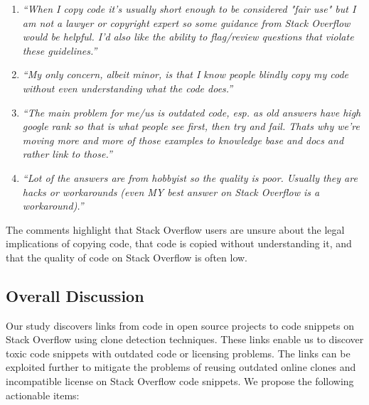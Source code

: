 \documentclass[10pt,journal,compsoc]{IEEEtran}
\begin{document}
\begin{enumerate}
	\item \textit{``When I copy code it's usually short enough to be considered "fair
		use" but I am not a lawyer or copyright expert so some guidance from Stack Overflow would be
		helpful. I'd also like the ability to flag/review questions that violate these
		guidelines.''}
	\item \textit{``My only concern, albeit minor, is that I know people blindly copy
		my code without even understanding what the code does.''}
	\item \textit{``The main problem for me/us is outdated code, esp. as old answers
		have high google rank so that is what people see first, then try and fail. Thats
		why we're moving more and more of those examples to knowledge base and docs and
		rather link to those.''}
	\item \textit{``Lot of the answers are from hobbyist so the quality is poor.
		Usually they are hacks or workarounds (even MY best answer on Stack Overflow is a
		workaround).''}
\end{enumerate}

The comments highlight that Stack Overflow users are unsure about the
legal implications of copying code, that code is copied without
understanding it, and that the quality of code on Stack Overflow is
often low.

\subsection{Overall Discussion} %

Our study discovers links from code in open source projects to code snippets on
Stack Overflow using clone detection techniques. These links enable us to
discover toxic code snippets with outdated code or licensing problems. 
The links can be exploited further to mitigate the problems of reusing outdated online clones and
incompatible license on Stack Overflow code snippets. We propose the following
actionable items: 
\end{document}
